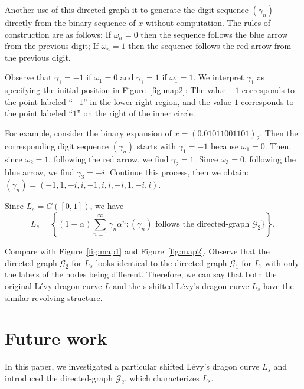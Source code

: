\documentclass[epsf,10pt]{article}
\newcommand\GG{\mathcal{G}}
\begin{document}
Another use of this directed graph it to generate the digit sequence $(\gamma_n)$ directly from the binary sequence of $x$ without computation. The rules of construction are as follows: If $\omega_n = 0$ then the sequence follows the blue arrow from the previous digit; If $\omega_n=1$ then the sequence follows the red arrow from the previous digit. 

%
Observe that $\gamma_1=-1$ if $\omega_1=0$ and $\gamma_1=1$ if $\omega_1=1$. We interpret $\gamma_1$ as specifying the initial position in Figure~\ref{fig:map2}: The value $-1$ corresponds to the point labeled ``$-1$'' in the lower right region, and the value $1$ corresponds to the point labeled ``$1$'' on the right of the inner circle.

For example, consider the binary expansion of $x=(0.01011001101)_2$. Then the corresponding digit sequence $(\gamma_n)$ starts with $\gamma_1 = -1$ because $\omega_1=0$. Then, since $\omega_2=1$, following the red arrow, we find $\gamma_2=1$. Since $\omega_3=0$, following the blue arrow, we find $\gamma_3=-i$. 
Continue this process, then we obtain:
$(\gamma_n)=(-1,1, -i, i, -1, i, i,-i, 1, -i,i)$.

\medskip

Since $L_s=G([0,1])$, we have 
\begin{equation}
\label{eq: L2 expression}
  L_s=\left\{ (1-\alpha) \sum_{n=1}^{\infty} \gamma_{n}\alpha^{n}: (\gamma_{n} ) \mbox{ follows the directed-graph $\GG_2$}\} \right\}, 
\end{equation}

Compare with Figure~\ref{fig:map1} and Figure~\ref{fig:map2}. Observe that the directed-graph $\GG_2$ for $L_s$ looks identical to the directed-graph $\GG_1$ for $L$, with only the labels of the nodes being different. Therefore, we can say that both the original L\'evy dragon curve $L$ and 
the s-shifted L\'evy's dragon curve $L_s$ have the similar revolving structure. 

\section{Future work}

In this paper, we investigated a particular shifted L\'evy's dragon curve $L_s$ and introduced the directed-graph $\GG_2$, which characterizes $L_s$. 
\end{document}
